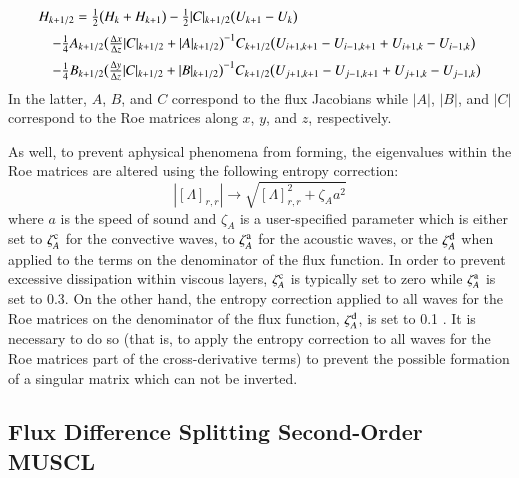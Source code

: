 \documentclass{warpdoc}
\newcommand{\alb}{\vspace{0.2cm}\\} %
\begin{document}
%
%
\begin{equation}
\begin{array}{l}
 H_{k+1/2}=
   \frac{1}{2}\bigl(H_{k}+H_{k+1}\bigr) 
  -\frac{1}{2}|C|_{k+1/2}\bigl( U_{k+1}- U_k \bigr) \alb
~~~~  -\frac{1}{4} A_{k+1/2} \bigl(\frac{\Delta x}{\Delta z}|C|_{k+1/2}+|A|_{k+1/2}\bigr)^{-1} C_{k+1/2} \bigl( U_{i+1,k+1} - U_{i-1,k+1} + U_{i+1,k} - U_{i-1,k} \bigr) \alb
~~~~  -\frac{1}{4} B_{k+1/2} \bigl( \frac{\Delta y}{\Delta z}|C|_{k+1/2} + |B|_{k+1/2} \bigr)^{-1} C_{k+1/2} \bigl( U_{j+1,k+1}-U_{j-1,k+1} +U_{j+1,k}-U_{j-1,k} \bigr)
\end{array}
\end{equation}
%
In the latter, $A$, $B$, and $C$ correspond to the flux Jacobians while $|A|$, $|B|$, and $|C|$ correspond to the Roe matrices along $x$, $y$, and $z$, respectively.



As well, to prevent aphysical phenomena from forming, the eigenvalues within the Roe matrices are altered using the following entropy correction:
%
\begin{equation}
  \left|\left[\Lambda \right]_{r,r}\right| \rightarrow \sqrt{\left[\Lambda \right]_{r,r}^2 + \zeta_A a^2}
\end{equation}
%
where $a$ is the speed of sound and $\zeta_A$ is a user-specified parameter which is either set to $\zeta_A^{\rm c}$ for the convective waves, to $\zeta_A^{\rm a}$ for the acoustic waves, or the $\zeta_A^{\rm d}$ when applied to the terms on the denominator of the flux function. In order to prevent excessive dissipation within viscous layers, $\zeta_A^{\rm c}$ is typically set to zero while $\zeta_A^{\rm a}$ is set to 0.3. On the other hand, the entropy correction applied to all waves for the Roe matrices on the denominator of the flux function, $\zeta_A^{\rm d}$, is set to 0.1 . It is necessary to do so (that is, to apply the entropy correction to all waves for the Roe matrices part of the cross-derivative terms) to prevent the possible formation of a singular matrix which can not be inverted.






\subsection{Flux Difference Splitting Second-Order MUSCL}
\end{document}
